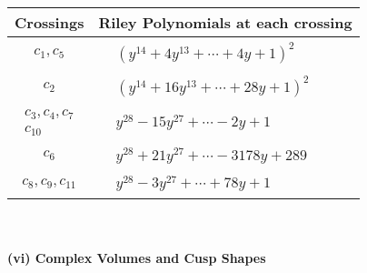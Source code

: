 \documentclass[1p]{elsarticle_modified}
\theoremstyle{definition}
\begin{document}
\begin{tabular}{m{50pt}|m{274pt}}
Crossings & \hspace{64pt}Riley Polynomials at each crossing \\
\hline $$\begin{aligned}c_{1},c_{5}\end{aligned}$$&$\begin{aligned}
&(y^{14}+4 y^{13}+\cdots+4 y+1)^{2}
\end{aligned}$\\
\hline $$\begin{aligned}c_{2}\end{aligned}$$&$\begin{aligned}
&(y^{14}+16 y^{13}+\cdots+28 y+1)^{2}
\end{aligned}$\\
\hline $$\begin{aligned}c_{3},c_{4},c_{7}\\c_{10}\end{aligned}$$&$\begin{aligned}
&y^{28}-15 y^{27}+\cdots-2 y+1
\end{aligned}$\\
\hline $$\begin{aligned}c_{6}\end{aligned}$$&$\begin{aligned}
&y^{28}+21 y^{27}+\cdots-3178 y+289
\end{aligned}$\\
\hline $$\begin{aligned}c_{8},c_{9},c_{11}\end{aligned}$$&$\begin{aligned}
&y^{28}-3 y^{27}+\cdots+78 y+1
\end{aligned}$\\
\hline
\end{tabular}\\~\\
\newpage\flushleft \textbf{(vi) Complex Volumes and Cusp Shapes}
\end{document}
